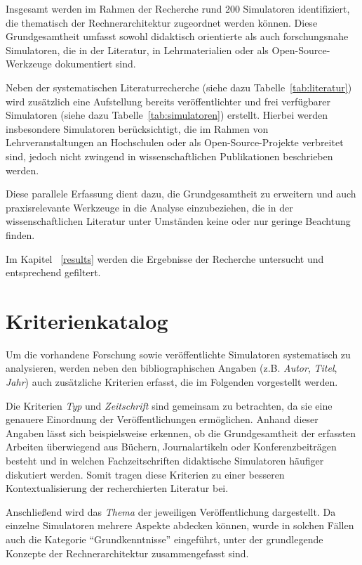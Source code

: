 Insgesamt werden im Rahmen der Recherche rund 200 Simulatoren identifiziert, die thematisch der Rechnerarchitektur zugeordnet werden können. Diese Grundgesamtheit umfasst sowohl didaktisch orientierte als auch forschungsnahe Simulatoren, die in der Literatur, in Lehrmaterialien oder als Open-Source-Werkzeuge dokumentiert sind.

Neben der systematischen Literaturrecherche (siehe dazu Tabelle~\ref{tab:literatur}) wird zusätzlich eine Aufstellung bereits veröffentlichter und frei verfügbarer Simulatoren (siehe dazu Tabelle~\ref{tab:simulatoren}) erstellt. Hierbei werden insbesondere Simulatoren berücksichtigt, die im Rahmen von Lehrveranstaltungen an Hochschulen oder als Open-Source-Projekte verbreitet sind, jedoch nicht zwingend in wissenschaftlichen Publikationen beschrieben werden.

Diese parallele Erfassung dient dazu, die Grundgesamtheit zu erweitern und auch praxisrelevante Werkzeuge in die Analyse einzubeziehen, die in der wissenschaftlichen Literatur unter Umständen keine oder nur geringe Beachtung finden.

Im Kapitel ~\ref{results} werden die Ergebnisse der Recherche untersucht und entsprechend gefiltert.

\section{Kriterienkatalog}\label{chap:kriterienkatalog}

Um die vorhandene Forschung sowie veröffentlichte Simulatoren systematisch zu analysieren, werden neben den bibliographischen Angaben (z.B. \textit{Autor}, \textit{Titel}, \textit{Jahr}) auch zusätzliche Kriterien erfasst, die im Folgenden vorgestellt werden.

Die Kriterien \textit{Typ} und \textit{Zeitschrift} sind gemeinsam zu betrachten, da sie eine genauere Einordnung der Veröffentlichungen ermöglichen. Anhand dieser Angaben lässt sich beispielsweise erkennen, ob die Grundgesamtheit der erfassten Arbeiten überwiegend aus Büchern, Journalartikeln oder Konferenzbeiträgen besteht und in welchen Fachzeitschriften didaktische Simulatoren häufiger diskutiert werden. Somit tragen diese Kriterien zu einer besseren Kontextualisierung der recherchierten Literatur bei.

Anschließend wird das \textit{Thema} der jeweiligen Veröffentlichung dargestellt. Da einzelne Simulatoren mehrere Aspekte abdecken können, wurde in solchen Fällen auch die Kategorie \enquote{Grundkenntnisse} eingeführt, unter der grundlegende Konzepte der Rechnerarchitektur zusammengefasst sind.

